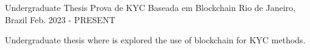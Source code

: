 

\begin{cventries}

  \cventry
    {Undergraduate Thesis} %
    {Prova de KYC Baseada em Blockchain} %
    {Rio de Janeiro, Brazil} %
    {Feb. 2023 - PRESENT} %
    {
      \begin{cvitems} %
        \item {Undergraduate thesis where is explored the use of blockchain for KYC methods.}
      \end{cvitems}
    }

\end{cventries}
